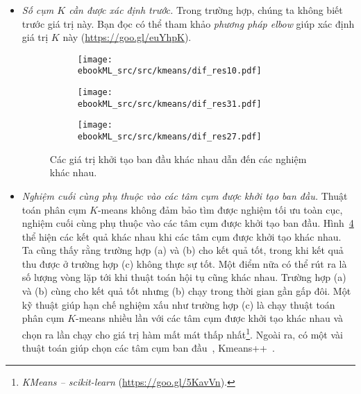 \begin{itemize}
\item \textit{Số cụm $K$ cần được xác định trước.}
Trong trường hợp, chúng ta không biết trước giá trị này. Bạn đọc có thể tham khảo \textit{phương pháp elbow} giúp xác định giá trị $K$ này (\url{https://goo.gl/euYhpK}).
\begin{figure}[t]
\begin{subfigure}{0.325\textwidth}
\texttt{[image: ebookML\_src/src/kmeans/dif\_res10.pdf]}
\caption{}
\label{fig:4_dif_resa}
\end{subfigure}
\begin{subfigure}{0.325\textwidth}
\texttt{[image: ebookML\_src/src/kmeans/dif\_res31.pdf]}
\caption{}
\label{fig:4_dif_resb}
\end{subfigure}
\begin{subfigure}{0.325\textwidth}
\texttt{[image: ebookML\_src/src/kmeans/dif\_res27.pdf]}
\caption{}
\label{fig:4_dif_resc}
\end{subfigure}
\caption{
Các giá trị khởi tạo ban đầu khác nhau dẫn đến các nghiệm khác nhau.
}
\label{fig:4_dif_res}
\end{figure}
\item \textit{Nghiệm cuối cùng phụ thuộc vào các tâm cụm được khởi tạo ban
đầu.}
Thuật toán phân cụm $K$-means không đảm bảo tìm được nghiệm tối ưu toàn cục, nghiệm cuối cùng phụ thuộc vào các tâm cụm được khởi tạo ban đầu.
Hình~\ref{fig:4_dif_res} thể hiện các kết quả khác nhau khi các tâm cụm
được khởi tạo khác nhau. Ta cũng thấy rằng trường hợp (a) và (b) cho kết quả
tốt, trong khi kết quả thu được ở trường hợp (c) không thực sự tốt. Một điểm
nữa có thể rút ra là số lượng vòng lặp tới khi thuật toán hội tụ cũng khác
nhau. Trường hợp (a) và (b) cùng cho kết quả tốt nhưng (b) chạy trong thời
gian gần gấp đôi. Một kỹ thuật giúp hạn chế nghiệm xấu như trường hợp (c) là
chạy thuật toán phân cụm $K$-means nhiều lần với các tâm cụm được khởi tạo
khác nhau và chọn ra lần chạy cho giá trị hàm mất mát thấp nhất\footnote{\textit{KMeans -- scikit-learn} (\url{https://goo.gl/5KavVn}).}. Ngoài ra, có một vài thuật toán giúp chọn các tâm cụm ban đầu~\cite{khan2004cluster},
Kmeans++~\cite{arthur2007k,bahmani2012scalable}.


\end{itemize}
